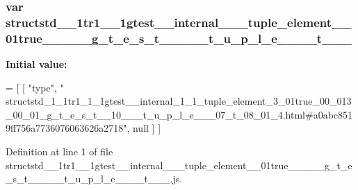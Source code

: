 \subsubsection[{\texorpdfstring{structstd\+\_\+1\+\_\+1tr1\+\_\+1\+\_\+1gtest\+\_\+\+\_\+internal\+\_\+1\+\_\+1\+\_\+tuple\+\_\+element\+\_\+3\+\_\+01true\+\_\+00\+\_\+013\+\_\+00\+\_\+01\+\_\+g\+\_\+t\+\_\+e\+\_\+s\+\_\+t\+\_\+\+\_\+10\+\_\+\+\_\+\+\_\+t\+\_\+u\+\_\+p\+\_\+l\+\_\+e\+\_\+\+\_\+\+\_\+07\+\_\+t\+\_\+08\+\_\+01\+\_\+4}{structstd_1_1tr1_1_1gtest__internal_1_1_tuple_element_3_01true_00_013_00_01_g_t_e_s_t__10___t_u_p_l_e___07_t_08_01_4}}]{\setlength{\rightskip}{0pt plus 5cm}var structstd\+\_\+\_\+1tr1\+\_\+\_\+1gtest\+\_\+\+\_\+internal\+\_\+\_\+\_\+tuple\+\_\+element\+\_\+\_\+01true\+\_\+\_\+\_\+\_\+\_\+g\+\_\+t\+\_\+e\+\_\+s\+\_\+t\+\_\+\+\_\+\_\+\+\_\+\+\_\+t\+\_\+u\+\_\+p\+\_\+l\+\_\+e\+\_\+\+\_\+\+\_\+\_\+t\+\_\+\_\+\_}\hypertarget{structstd__1__1tr1__1__1gtest____internal__1__1__tuple__element__3__01true__00__013__00__01__g__9efca6509983e6673d0230f77f177f1f_a829d911ca9e18f9809f2e2a26f6fd331}{}\label{structstd__1__1tr1__1__1gtest____internal__1__1__tuple__element__3__01true__00__013__00__01__g__9efca6509983e6673d0230f77f177f1f_a829d911ca9e18f9809f2e2a26f6fd331}
{\bfseries Initial value\+:}
\begin{DoxyCode}
=
[
    [ \textcolor{stringliteral}{"type"}, \textcolor{stringliteral}{"
      structstd\_1\_1tr1\_1\_1gtest\_\_internal\_1\_1\_tuple\_element\_3\_01true\_00\_013\_00\_01\_g\_t\_e\_s\_t\_\_10\_\_\_t\_u\_p\_l\_e\_\_\_07\_t\_08\_01\_4.html#a0abc8519ff756a7736076063626a2718"}, null ]
]
\end{DoxyCode}


Definition at line 1 of file structstd\+\_\+\_\+1tr1\+\_\+\_\+1gtest\+\_\+\+\_\+internal\+\_\+\_\+\_\+tuple\+\_\+element\+\_\+\_\+01true\+\_\+\_\+\_\+\_\+\_\+g\+\_\+t\+\_\+e\+\_\+s\+\_\+t\+\_\+\+\_\+\_\+\+\_\+\+\_\+t\+\_\+u\+\_\+p\+\_\+l\+\_\+e\+\_\+\+\_\+\+\_\+\_\+t\+\_\+\_\+\_.\+js.

